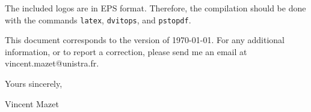 \documentclass[a4paper,11pt,twosided]{letter}
\begin{document}
\bigskip

The included logos are in EPS format. Therefore, the compilation should be done with the commands \texttt{latex}, \texttt{dvitops}, and \texttt{pstopdf}.

\bigskip

This document corresponds to the version of \today.
For any additional information, or to report a correction, please send me an email at vincent.mazet@unistra.fr.

\bigskip

Yours sincerely,

\bigskip\bigskip

\hfill Vincent Mazet
\end{document}
